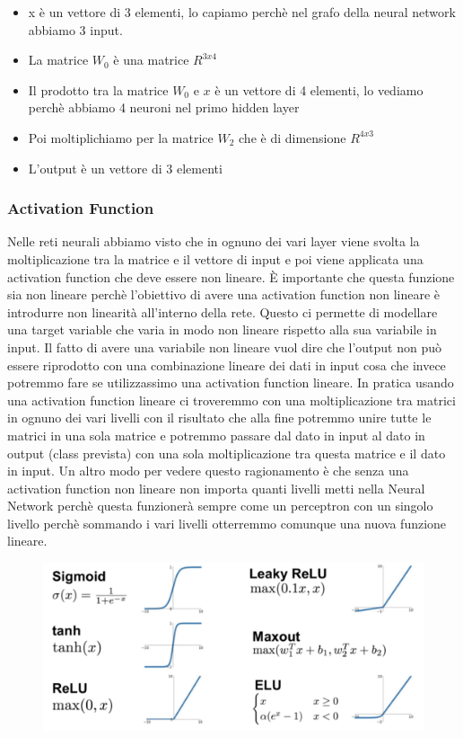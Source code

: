 \documentclass[14pt]{extreport}
\begin{document}
\begin{itemize}
	\item x è un vettore di 3 elementi, lo capiamo perchè nel grafo della neural network abbiamo 3 input.
	\item La matrice $W_0$ è una matrice $R^{3x4}$
	\item Il prodotto tra la matrice $W_0$ e $x$ è un vettore di 4 elementi, lo vediamo perchè abbiamo 4 neuroni nel primo hidden layer
	\item Poi moltiplichiamo per la matrice $W_2$ che è di dimensione $R^{4x3}$
	\item L'output è un vettore di 3 elementi
\end{itemize}

\subsubsection{Activation Function}

Nelle reti neurali abbiamo visto che in ognuno dei vari layer viene svolta la moltiplicazione tra la matrice e il vettore di input e poi viene
applicata una activation function che deve essere non lineare. È importante che questa funzione sia non lineare perchè l'obiettivo di avere una
activation function non lineare è introdurre non linearità all'interno della rete. Questo ci permette di modellare una target variable che varia in
modo non lineare rispetto alla sua variabile in input. Il fatto di avere una variabile non lineare vuol dire che l'output non può essere riprodotto
con una combinazione lineare dei dati in input cosa che invece potremmo fare se utilizzassimo una activation function lineare. In pratica usando una
activation function lineare ci troveremmo con una moltiplicazione tra matrici in ognuno dei vari livelli con il risultato che alla fine potremmo unire
tutte le matrici in una sola matrice e potremmo passare dal dato in input al dato in output (class prevista) con una sola moltiplicazione tra questa
matrice e il dato in input. Un altro modo per vedere questo ragionamento è che senza una activation function non lineare non importa quanti livelli
metti nella Neural Network perchè questa funzionerà sempre come un perceptron con un singolo livello perchè sommando i vari livelli otterremmo
comunque una nuova funzione lineare.

\begin{figure}[H]
	\centering
	\includegraphics[width=0.7\linewidth]{371.jpeg}
\end{figure}
\end{document}
